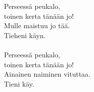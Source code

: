 
            Perseessä peukalo, \\
            toinen kerta tänään jo! \\
            Mulle maistuu jo tää. \\
            Tieheni käyn. \\
\hspace{10mm} \\
            Perseessä peukalo, \\
            toinen kerta tänään jo! \\
            Ainainen naiminen vituttaa. \\
            Tieni käy. \\
             \\
\hspace{10mm} \\
 \\
\hspace{10mm} \\

